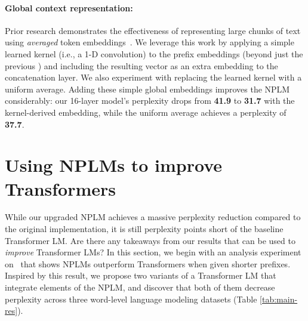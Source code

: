 \documentclass[11pt]{article}
\begin{document}
\paragraph{Global context representation:} Prior research demonstrates the effectiveness of representing large chunks of text using \emph{averaged} token embeddings~\citep{iyyer-etal-2015-deep,wieting2015towards}. We leverage this work by applying a simple learned kernel (i.e., a 1-D convolution) to the prefix embeddings (beyond just the previous ) and including the resulting vector as an extra embedding
to the concatenation layer. We also experiment with replacing the learned kernel with a uniform average. Adding these simple global embeddings improves the NPLM considerably: our 16-layer model's perplexity drops from \textbf{41.9} to \textbf{31.7} with the kernel-derived embedding, while the uniform average achieves a perplexity of \textbf{37.7}. 






















 


\section{Using NPLMs to improve Transformers}

While our upgraded NPLM achieves a massive perplexity reduction compared to the original implementation, it is still  perplexity points short of the baseline Transformer LM. Are there any takeaways from our results that can be used to \emph{improve} Transformer LMs? In this section, we begin with an analysis experiment on \wtthree\ that shows NPLMs outperform Transformers when given shorter prefixes. Inspired by this result, we propose two variants of a Transformer LM that integrate elements of the NPLM, and discover that both of them decrease perplexity across three word-level language modeling datasets (Table \ref{tab:main-res}). 
\end{document}
